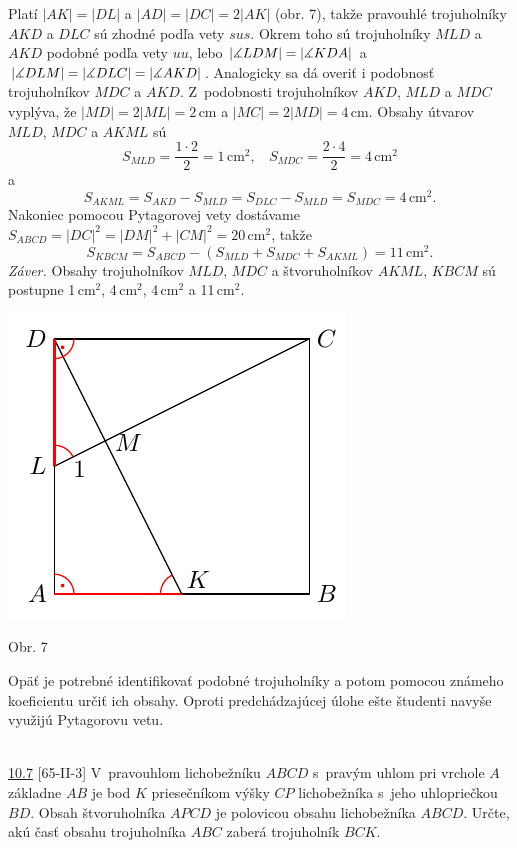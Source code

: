 \rieh Platí $|AK| = |DL|$ a $|AD| = |DC| = 2|AK|$ (obr. 7), takže pravouhlé trojuholníky $AKD$ a $DLC$ sú zhodné podľa vety $sus$. Okrem toho sú trojuholníky $MLD$ a $AKD$ podobné podľa vety $uu$, lebo $|\measuredangle LDM| = |\measuredangle KDA|$ a $|\measuredangle DLM| = |\measuredangle DLC| = |\measuredangle AKD|$. Analogicky sa dá overiť i podobnosť trojuholníkov $MDC$ a $AKD$. Z~podobnosti trojuholníkov $AKD$, $MLD$ a $MDC$ vyplýva, že $|MD| = 2|ML| = 2$\,cm a $|MC| = 2|MD| = 4$\,cm. Obsahy útvarov $MLD$, $MDC$ a $AKML$ sú
$$S_{MLD} =\frac{1\cdot 2}{2}= 1\,\text{cm}^2, \ \ \ \  S_{MDC} = \frac{2\cdot 4}{2}= 4\,\text{cm}^2$$
a
$$S_{AKML} = S_{AKD}- S_{MLD} = S_{DLC} - S_{MLD} = S_{MDC} = 4\,\text{cm}^2.$$
Nakoniec pomocou Pytagorovej vety dostávame $S_{ABCD} = |DC|^2 = |DM|^2 + |CM|^2= 20$\,cm$^2$, takže
$$S_{KBCM} = S_{ABCD} - (S_{MLD} + S_{MDC} + S_{AKML}) = 11\,\text{cm}^2.$$
\textit{Záver.} Obsahy trojuholníkov $MLD$, $MDC$ a štvoruholníkov $AKML$, $KBCM$ sú postupne 1\,cm$^2$, 4\,cm$^2$, 4\,cm$^2$ a 11\,cm$^2$.
\begin{center}
\includegraphics{obrazky/63D41}

Obr. 7
\end{center}
\kom Opäť je potrebné identifikovať podobné trojuholníky a potom pomocou známeho koeficientu určiť ich obsahy. Oproti predchádzajúcej úlohe ešte študenti navyše využijú Pytagorovu vetu.\\
\\
\begin{tcolorbox}[breakable,notitle,boxrule=0pt,colback=light-gray,colframe=light-gray]\ul{10.7} [65-II-3] V~pravouhlom lichobežníku $ABCD$ s~pravým uhlom pri vrchole $A$ základne $AB$ je bod $K$ priesečníkom výšky $CP$ lichobežníka s~jeho uhlopriečkou $BD$. Obsah štvoruholníka $APCD$ je polovicou obsahu lichobežníka $ABCD$. Určte, akú časť obsahu trojuholníka $ABC$ zaberá trojuholník $BCK$.

\end{tcolorbox}

